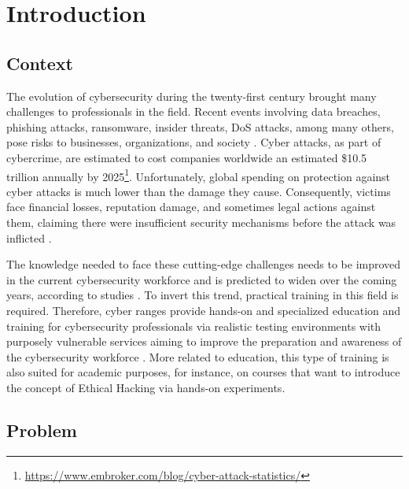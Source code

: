 \chapter{Introduction} \label{chap:intro}

\minitoc

\section{Context} \label{sec:context}

The evolution of cybersecurity during the twenty-first century brought many challenges to professionals in the field. Recent events involving data breaches, phishing attacks, ransomware, insider threats, DoS attacks, among many others, pose risks to businesses, organizations, and society \citep{cyber_warfare_ref}. Cyber attacks, as part of cybercrime, are estimated to cost companies worldwide an estimated \$10.5 trillion annually by 2025\footnote{\url{https://www.embroker.com/blog/cyber-attack-statistics/}}. Unfortunately, global spending on protection against cyber attacks is much lower than the damage they cause. Consequently, victims face financial losses, reputation damage, and sometimes legal actions against them, claiming there were insufficient security mechanisms before the attack was inflicted \citep{cyber_challenges_ref}.

The knowledge needed to face these cutting-edge challenges needs to be improved in the current cybersecurity workforce and is predicted to widen over the coming years, according to studies \citep{cyber_range_nist_reg}. To invert this trend, practical training in this field is required. Therefore, cyber ranges provide hands-on and specialized education and training for cybersecurity professionals via realistic testing environments with purposely vulnerable services aiming to improve the preparation and awareness of the cybersecurity workforce \citep{cr_and_security_testbeds_ref, leaf_ref}. More related to education, this type of training is also suited for academic purposes, for instance, on courses that want to introduce the concept of Ethical Hacking via hands-on experiments.

\section{Problem} \label{sec:problem}

